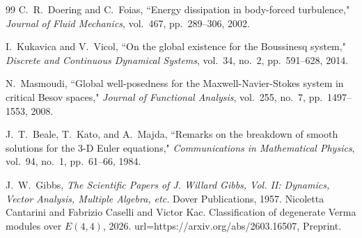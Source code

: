 \documentclass[reqno,10pt]{amsart}
\theoremstyle{plain}
\theoremstyle{definition}
\begin{document}
\begin{thebibliography}{99}
C.~R.~Doering and C.~Foias,
``Energy dissipation in body-forced turbulence,"
\textit{Journal of Fluid Mechanics}, vol.~467, pp.~289--306, 2002.

I.~Kukavica and V.~Vicol,
``On the global existence for the Boussinesq system,"
\textit{Discrete and Continuous Dynamical Systems}, vol.~34, no.~2, pp.~591--628, 2014.

N.~Masmoudi,
``Global well-posedness for the Maxwell-Navier-Stokes system in critical Besov spaces,"
\textit{Journal of Functional Analysis}, vol.~255, no.~7, pp.~1497--1553, 2008.

J.~T.~Beale, T.~Kato, and A.~Majda,
``Remarks on the breakdown of smooth solutions for the 3-D Euler equations,"
\textit{Communications in Mathematical Physics}, vol.~94, no.~1, pp.~61--66, 1984.

J.~W.~Gibbs,
\textit{The Scientific Papers of J. Willard Gibbs, Vol. II: Dynamics, Vector Analysis, Multiple Algebra, etc.}
Dover Publications, 1957.
{
  Nicoletta Cantarini and Fabrizio Caselli and Victor Kac.
      Classification of degenerate Verma modules over $E(4,4)$, 
      2026.
      url={https://arxiv.org/abs/2603.16507}, 
}
\newblock Preprint.
\end{thebibliography}
\end{document}
